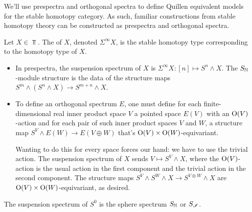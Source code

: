 We'll use prespectra and orthogonal spectra to define Quillen equivalent models for the stable homotopy category.
As such, familiar constructions from stable homotopy theory can be constructed as prespectra and orthogonal
spectra.
\begin{exm}
Let $X\in\Top$. The  of $X$, denoted $\Sigma^\infty X$, is the stable homotopy type
corresponding to the homotopy type of $X$.
\begin{itemize}
	\item In prespectra, the suspension spectrum of $X$ is $\Sigma^\infty X\colon [n]\mapsto S^n\wedge X$. The
	$S_\mathbb N$-module structure is the data of the structure maps $S^m\wedge (S^n\wedge X)\to S^{m+n}\wedge X$.
	\item To define an orthogonal spectrum $E$, one must define for each finite-dimensional real inner product
	space $V$ a pointed space $E(V)$ with an $\mathrm O(V)$-action and for each pair of such inner product spaces $V$ and
	$W$, a structure map $S^V\wedge E(W)\to E(V\oplus W)$ that's $\mathrm O(V)\times\mathrm O(W)$-equivariant.

	Wanting to do this for every space forces our hand: we have to use the trivial action. The suspension spectrum
	of $X$ sends $V\mapsto S^V\wedge X$, where the $\mathrm O(V)$-action is the usual action in the first component and
	the trivial action in the second component. The structure maps $S^V\wedge S^W\wedge X\to S^{V\oplus W}\wedge X$
	are $\mathrm O(V)\times\mathrm O(W)$-equivariant, as desired.
\end{itemize}
The suspension spectrum of $S^0$ is the sphere spectrum $S_\mathbb N$ or $S_\mathscr I$.
\end{exm}
